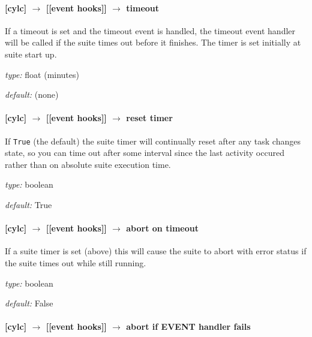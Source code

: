 \paragraph[timeout]{[cylc] $\rightarrow$ [[event hooks]] $\rightarrow$ timeout}

If a timeout is set and the timeout event is handled, the timeout event
handler will be called if the suite times out before it finishes.
The timer is set initially at suite start up. 

\begin{myitemize}
    \item {\em type:} float (minutes)
    \item {\em default:} (none)
\end{myitemize}

\paragraph[reset timer]{[cylc] $\rightarrow$ [[event hooks]] $\rightarrow$ reset timer}

If \lstinline=True= (the default) the suite timer will continually reset
after any task changes state, so you can time out after some interval
since the last activity occured rather than on absolute suite execution
time.

\begin{myitemize}
    \item {\em type:} boolean
    \item {\em default:} True
\end{myitemize}

\paragraph[abort on timeout]{[cylc] $\rightarrow$ [[event hooks]] $\rightarrow$ abort on timeout}

If a suite timer is set (above) this will cause the suite to abort with
error status if the suite times out while still running.

\begin{myitemize}
    \item {\em type:} boolean
    \item {\em default:} False
\end{myitemize}

\paragraph[abort if startup handler fails]{[cylc] $\rightarrow$ [[event hooks]] $\rightarrow$ abort if EVENT handler fails}

